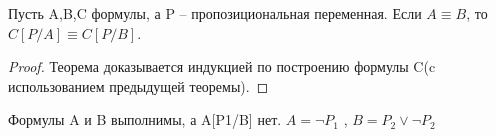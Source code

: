 \begin{theorem}
 Пусть A,B,C формулы, а P -- пропозициональная переменная. Если ${A}\equiv{B}$, то $ { C[P/A]} \equiv  {C[P/B]} $.

\end{theorem}
\begin{proof}
Теорема доказывается индукцией по построению формулы C(c использованием предыдущей теоремы).
\end{proof}

\begin{example}
Формулы A и B выполнимы, а A[P1/B] нет.  $A=\neg P_{1}$ , $B=P_{2} \vee \neg P_{2}$
\end{example}
